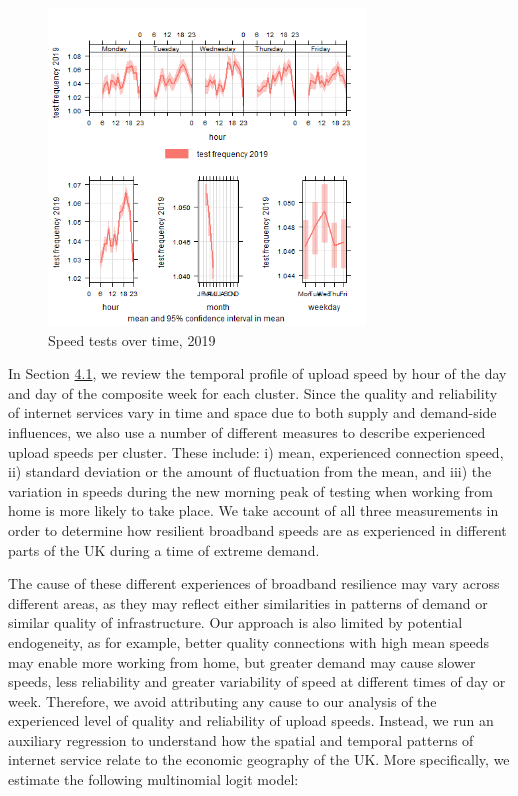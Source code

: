 \documentclass[Royal,times,sageh]{sagej}
\begin{document}
\begin{figure}
\centering
\includegraphics[width=0.75\textwidth,height=0.4\textheight]{figures/time.var.plot2019.png}
\caption{Speed tests over time, 2019 \label{test2019}}
\end{figure}

In Section \protect\hyperlink{sec:4.1}{4.1}, we review the temporal
profile of upload speed by hour of the day and day of the composite week
for each cluster. Since the quality and reliability of internet services
vary in time and space due to both supply and demand-side influences, we
also use a number of different measures to describe experienced upload
speeds per cluster. These include: i) mean, experienced connection
speed, ii) standard deviation or the amount of fluctuation from the
mean, and iii) the variation in speeds during the new morning peak of
testing when working from home is more likely to take place. We take
account of all three measurements in order to determine how resilient
broadband speeds are as experienced in different parts of the UK during
a time of extreme demand.

The cause of these different experiences of broadband resilience may
vary across different areas, as they may reflect either similarities in
patterns of demand or similar quality of infrastructure. Our approach is
also limited by potential endogeneity, as for example, better quality
connections with high mean speeds may enable more working from home, but
greater demand may cause slower speeds, less reliability and greater
variability of speed at different times of day or week. Therefore, we
avoid attributing any cause to our analysis of the experienced level of
quality and reliability of upload speeds. Instead, we run an auxiliary
regression to understand how the spatial and temporal patterns of
internet service relate to the economic geography of the UK. More
specifically, we estimate the following multinomial logit model:
\end{document}
